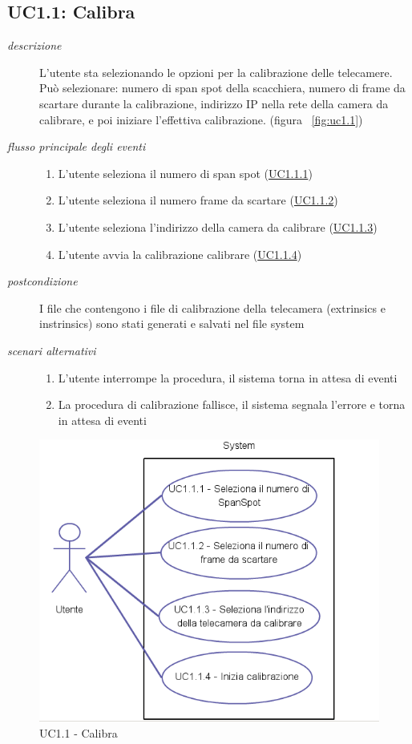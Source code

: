 \subsection{UC1.1: Calibra} \label{sec:UC1.1}
\begin{description}
\item[\em{descrizione }]L'utente sta selezionando le opzioni per la calibrazione delle telecamere. Può selezionare: numero di span spot della scacchiera, numero di frame da scartare durante la calibrazione, indirizzo IP nella rete della camera da calibrare, e poi iniziare l'effettiva calibrazione. (figura ~\ref{fig:uc1.1})
\item[\em{flusso principale degli eventi }] \mbox{}
\begin{enumerate}
\item L'utente seleziona il numero di span spot (\hyperref[sec:uc1.1.1]{UC1.1.1})
\item L'utente seleziona il numero frame da scartare (\hyperref[sec:uc1.1.2]{UC1.1.2})
\item L'utente seleziona l'indirizzo della camera da calibrare (\hyperref[sec:uc1.1.3]{UC1.1.3})
\item L'utente avvia la calibrazione calibrare (\hyperref[sec:uc1.1.4]{UC1.1.4})
\end{enumerate}
\item[\em{postcondizione }] I file che contengono i file di calibrazione della telecamera (extrinsics e instrinsics) sono stati generati e salvati nel file system
\item[\em{scenari alternativi }] \mbox{} 
\begin{enumerate} 
\item L'utente interrompe la procedura, il sistema torna in attesa di eventi
\item La procedura di calibrazione fallisce, il sistema segnala l'errore e torna in attesa di eventi
\end{enumerate}
\end{description}

\begin{figure}[htpb] 
\centering 
\includegraphics[scale=0.4]{./images/uc11.png} 
\caption{UC1.1 - Calibra} 
\label{fig:UC1.1}
\end{figure} 

